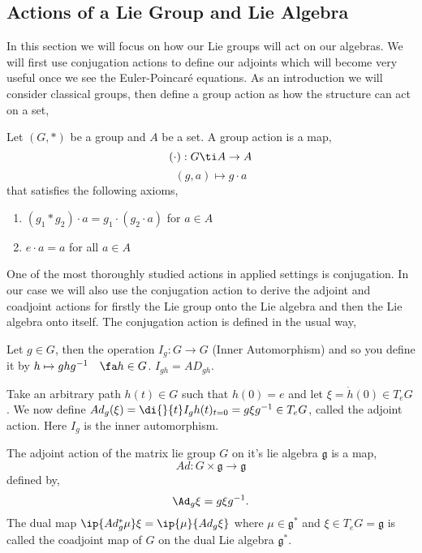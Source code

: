 
\subsection{Actions of a Lie Group and Lie Algebra}
In this section we will focus on how our Lie groups will act on our algebras. We will first use conjugation actions to define our adjoints which will become very useful once we see the Euler-Poincar\'e equations. As an introduction we will consider classical groups, then define a group action as how the structure can act on a set,
\begin{ndefi}
  Let $(G, *)$ be a group and $A$ be a set. A group action is a map,
  $$ (\cdot) : G \ti A \to A $$
  $$ (g, a) \mapsto g \cdot a $$
  that satisfies the following axioms,
  \begin{enumerate}[(\bfseries{A}1)]
    \item $(g_1 * g_2) \cdot a = g_1 \cdot (g_2 \cdot a)$ for $a \in A$
    \item $e \cdot a = a$ for all $a \in A$
  \end{enumerate}
\end{ndefi}

\noindent
One of the most thoroughly studied actions in applied settings is conjugation. In our case we will also use the conjugation action to derive the adjoint and coadjoint actions for firstly the Lie group onto the Lie algebra and then the Lie algebra onto itself. The conjugation action is defined in the usual way,

\begin{ndefi}
  Let $g \in G$, then the operation $I_g : G \to G$ (Inner Automorphism) and so you define it by $h \mapsto ghg^{-1}\quad\fa h \in G$. $I_{gh} = AD_{gh}$.
\end{ndefi}

\noindent
Take an arbitrary path $h(t) \in {G}$ such that $h(0) = e$ and let $\xi = \dot h(0) \in T_eG$. We now define $Ad_g(\xi) = \di {}{t} I_g h(t)_{t=0} = g \xi g^{-1} \in T_eG$, called the adjoint action. Here $I_g$ is the inner automorphism.

\begin{ndefi}
  The adjoint action of the matrix lie group $G$ on it's lie algebra $\mathfrak{g}$ is a map,
  $$ Ad : G \times \mathfrak{g} \to \mathfrak{g} $$
  defined by,
  $$ \Ad_g \xi = g\xi g^{-1}. $$
  The dual map $\ip {Ad^*_g \mu} \xi = \ip {\mu} {Ad_g\xi}$ where $\mu \in \mathfrak{g}^*$ and $\xi \in T_eG = \mathfrak{g}$ is called the coadjoint map of $G$ on the dual Lie algebra $\mathfrak{g}^*$.
\end{ndefi}

